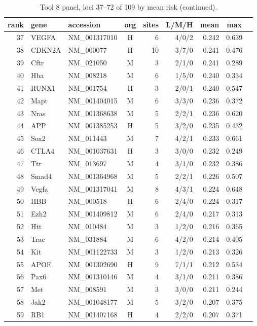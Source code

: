 \begin{table}[h]
\centering\footnotesize
\caption{Tool 8 panel, loci 37--72 of 109 by mean risk (continued).}
\begin{tabular}{rllcrrrcc}
\hline
rank & gene & accession & org & sites & L/M/H & mean & max \\
\hline
37 & VEGFA & NM\_001317010 & H & 6 & 4/0/2 & 0.242 & 0.639 \\
38 & CDKN2A & NM\_000077 & H & 10 & 3/7/0 & 0.241 & 0.476 \\
39 & Cftr & NM\_021050 & M & 3 & 2/1/0 & 0.241 & 0.289 \\
40 & Hba & NM\_008218 & M & 6 & 1/5/0 & 0.240 & 0.334 \\
41 & RUNX1 & NM\_001754 & H & 3 & 2/0/1 & 0.240 & 0.547 \\
42 & Mapt & NM\_001404015 & M & 6 & 3/3/0 & 0.236 & 0.372 \\
43 & Nras & NM\_001368638 & M & 5 & 2/2/1 & 0.236 & 0.620 \\
44 & APP & NM\_001385253 & H & 5 & 3/2/0 & 0.235 & 0.432 \\
45 & Sox2 & NM\_011443 & M & 7 & 4/2/1 & 0.233 & 0.661 \\
46 & CTLA4 & NM\_001037631 & H & 3 & 3/0/0 & 0.232 & 0.249 \\
47 & Ttr & NM\_013697 & M & 4 & 3/1/0 & 0.232 & 0.386 \\
48 & Smad4 & NM\_001364968 & M & 5 & 2/2/1 & 0.226 & 0.507 \\
49 & Vegfa & NM\_001317041 & M & 8 & 4/3/1 & 0.224 & 0.648 \\
50 & HBB & NM\_000518 & H & 6 & 2/4/0 & 0.224 & 0.317 \\
51 & Ezh2 & NM\_001409812 & M & 6 & 2/4/0 & 0.217 & 0.313 \\
52 & Htt & NM\_010484 & M & 3 & 1/2/0 & 0.216 & 0.365 \\
53 & Trac & NM\_031884 & M & 6 & 4/2/0 & 0.214 & 0.405 \\
54 & Kit & NM\_001122733 & M & 3 & 1/2/0 & 0.213 & 0.326 \\
55 & APOE & NM\_001302690 & H & 9 & 7/1/1 & 0.212 & 0.534 \\
56 & Pax6 & NM\_001310146 & M & 4 & 3/1/0 & 0.211 & 0.386 \\
57 & Met & NM\_008591 & M & 3 & 3/0/0 & 0.211 & 0.244 \\
58 & Jak2 & NM\_001048177 & M & 5 & 3/2/0 & 0.207 & 0.375 \\
59 & RB1 & NM\_001407168 & H & 4 & 2/2/0 & 0.207 & 0.371 \\

\end{tabular}
\end{table}
